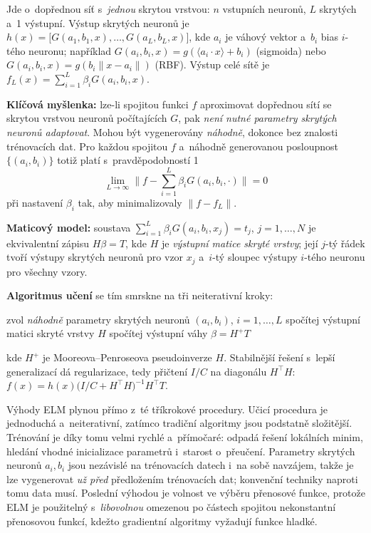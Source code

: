 \documentclass[11pt,a4paper]{article}
\theoremstyle{definition}
\begin{document}
\begin{defbox}
Jde o~dopřednou síť s~\emph{jednou} skrytou vrstvou: $n$ vstupních neuronů, $L$ skrytých
a~1 výstupní. Výstup skrytých neuronů je
$h(x)=\big[G(a_1,b_1,x),\dots,G(a_L,b_L,x)\big]$, kde $a_i$ je váhový vektor a~$b_i$ bias
$i$-tého neuronu; například $G(a_i,b_i,x)=g(\langle a_i\cdot x\rangle+b_i)$ (sigmoida) nebo
$G(a_i,b_i,x)=g(b_i\|x-a_i\|)$ (RBF). Výstup celé sítě je
$f_L(x)=\sum_{i=1}^{L}\beta_iG(a_i,b_i,x)$.

\textbf{Klíčová myšlenka:} lze-li spojitou funkci $f$ aproximovat dopřednou sítí se skrytou
vrstvou neuronů počítajících $G$, pak \emph{není nutné parametry skrytých neuronů adaptovat}.
Mohou být vygenerovány \emph{náhodně}, dokonce bez znalosti trénovacích dat. Pro každou
spojitou $f$ a~náhodně generovanou posloupnost $\{(a_i,b_i)\}$ totiž platí
s~pravděpodobností 1
\[ \lim_{L\to\infty}\Big\|f-\textstyle\sum_{i=1}^{L}\beta_iG(a_i,b_i,\cdot)\Big\|=0 \]
při nastavení $\beta_i$ tak, aby minimalizovaly $\|f-f_L\|$.

\textbf{Maticový model:} soustava $\sum_{i=1}^{L}\beta_iG(a_i,b_i,x_j)=t_j$,
$j=1,\dots,N$ je ekvivalentní zápisu $H\beta=T$, kde $H$ je \emph{výstupní matice skryté
vrstvy}; její $j$-tý řádek tvoří výstupy skrytých neuronů pro vzor $x_j$ a~$i$-tý sloupec
výstupy $i$-tého neuronu pro všechny vzory.

\textbf{Algoritmus učení} se tím smrskne na tři neiterativní kroky:
\begin{algorithmic}[1]
\State zvol \emph{náhodně} parametry skrytých neuronů $(a_i,b_i)$, $i=1,\dots,L$
\State spočítej výstupní matici skryté vrstvy $H$
\State spočítej výstupní váhy $\beta=H^{+}T$
\end{algorithmic}
kde $H^{+}$ je Mooreova--Penroseova pseudoinverze $H$. Stabilnější řešení s~lepší generalizací
dá regularizace, tedy přičtení $I/C$ na diagonálu $H^{\!\top}H$:
$f(x)=h(x)\big(I/C+H^{\!\top}H\big)^{-1}H^{\!\top}T$.
\end{defbox}

Výhody ELM plynou přímo z~té tříkrokové procedury. Učicí procedura je jednoduchá
a~neiterativní, zatímco tradiční algoritmy jsou podstatně složitější. Trénování je díky tomu
velmi rychlé a~přímočaré: odpadá řešení lokálních minim, hledání vhodné inicializace parametrů
i~starost o~přeučení. Parametry skrytých neuronů $a_i,b_i$ jsou nezávislé na trénovacích datech
i~na sobě navzájem, takže je lze vygenerovat \emph{už před} předložením trénovacích dat;
konvenční techniky naproti tomu data  musí. Poslední výhodou je volnost ve výběru
přenosové funkce, protože ELM je použitelný s~\emph{libovolnou} omezenou po částech spojitou
nekonstantní přenosovou funkcí, kdežto gradientní algoritmy vyžadují funkce hladké.
\end{document}
